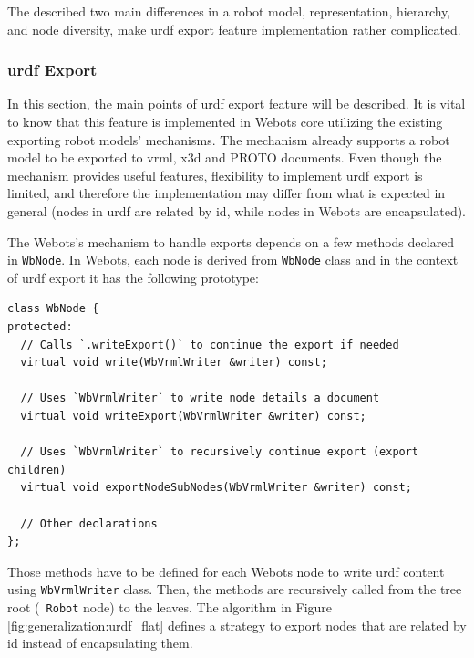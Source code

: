 The described two main differences in a robot model, representation, hierarchy, and node diversity, make \ac{urdf} export feature implementation rather complicated. 

\subsubsection{\ac{urdf} Export}
\label{subsub:generalization:urdf_export}

In this section, the main points of \ac{urdf} export feature will be described.
It is vital to know that this feature is implemented in Webots core utilizing the existing exporting robot models' mechanisms.
The mechanism already supports a robot model to be exported to \acs{vrml}, \acs{x3d} and PROTO documents.
Even though the mechanism provides useful features, flexibility to implement \ac{urdf} export is limited, and therefore the implementation may differ from what is expected in general (nodes in \ac{urdf} are related by \acs{id}, while nodes in Webots are encapsulated).

The Webots's mechanism to handle exports depends on a few methods declared in \texttt{WbNode}.
In Webots, each node is derived from \texttt{WbNode} class and in the context of \ac{urdf} export it has the following prototype:
\begin{verbatim}
class WbNode {
protected:
  // Calls `.writeExport()` to continue the export if needed
  virtual void write(WbVrmlWriter &writer) const;

  // Uses `WbVrmlWriter` to write node details a document
  virtual void writeExport(WbVrmlWriter &writer) const;
  
  // Uses `WbVrmlWriter` to recursively continue export (export children)
  virtual void exportNodeSubNodes(WbVrmlWriter &writer) const;
  
  // Other declarations
};
\end{verbatim}

Those methods have to be defined for each Webots node to write \ac{urdf} content using \texttt{WbVrmlWriter} class.
Then, the methods are recursively called from the tree root (\texttt{ Robot} node) to the leaves.
The algorithm in Figure \ref{fig:generalization:urdf_flat} defines a strategy to export nodes that are related by \acs{id} instead of encapsulating them.

